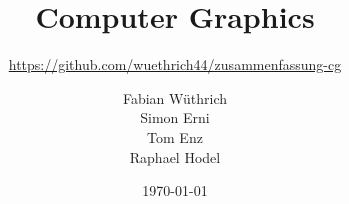 \titlehead{Hochschule Luzern \\ 
	Technik \& Architektur}
\subject{Zusammenfassung}
\title{Computer Graphics}
\subtitle{\url{https://github.com/wuethrich44/zusammenfassung-cg}}
\author{Fabian Wüthrich \\ 
	Simon Erni \\
	Tom Enz\\
	 Raphael Hodel}
\date{\today}

\maketitle